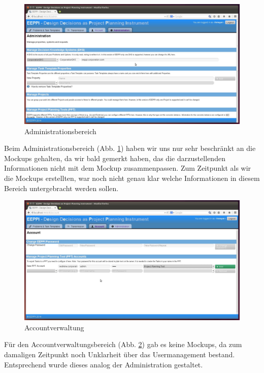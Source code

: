 		
		\begin{figure}[H]
			\centering
			\includegraphics[width=\linewidth]{tutorial/img/administrationDKS.jpg}
			\caption{Administrationsbereich}
			\label{fig:eeppiAdministration}
		\end{figure}	
		
		Beim Administrationsbereich (Abb. \ref{fig:eeppiAdministration}) haben wir uns nur sehr beschränkt an die Mockups gehalten, 
		da wir bald gemerkt haben, das die darzustellenden Informationen nicht mit dem Mockup zusammenpassen.
		Zum Zeitpunkt als wir die Mockups erstellten, 
		war noch nicht genau klar welche Informationen in diesem Bereich untergebracht werden sollen.		
		
		
		\begin{figure}[H]
			\centering
			\includegraphics[width=\linewidth]{tutorial/img/accountPPTAccount.jpg}
			\caption{Accountverwaltung}
			\label{fig:eeppiAccountManagement}
		\end{figure}	
		
		Für den Accountverwaltungsbereich (Abb. \ref{fig:eeppiAccountManagement}) gab es keine Mockups, da zum damaligen Zeitpunkt noch Unklarheit über das Usermanagement bestand.
		Entsprechend wurde dieses analog der Administration gestaltet.
		

